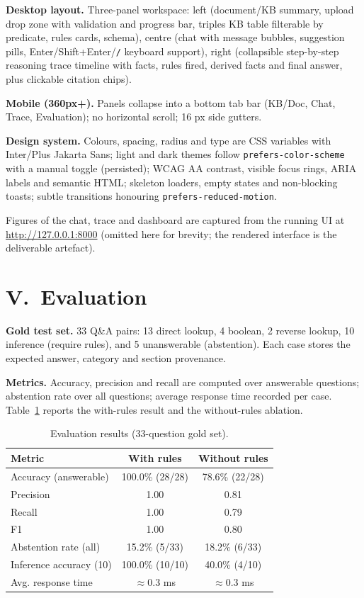 \documentclass[10pt,twocolumn]{article}
\begin{document}
\textbf{Desktop layout.} Three-panel workspace: left (document/KB summary,
upload drop zone with validation and progress bar, triples KB table filterable by
predicate, rules cards, schema), centre (chat with message bubbles, suggestion
pills, Enter/Shift+Enter/\texttt{/} keyboard support), right (collapsible
step-by-step reasoning trace timeline with facts, rules fired, derived facts and
final answer, plus clickable citation chips).

\textbf{Mobile (360px+).} Panels collapse into a bottom tab bar (KB/Doc, Chat,
Trace, Evaluation); no horizontal scroll; 16 px side gutters.

\textbf{Design system.} Colours, spacing, radius and type are CSS variables with
Inter/Plus Jakarta Sans; light and dark themes follow
\verb|prefers-color-scheme| with a manual toggle (persisted); WCAG AA contrast,
visible focus rings, ARIA labels and semantic HTML; skeleton loaders, empty
states and non-blocking toasts; subtle transitions honouring
\verb|prefers-reduced-motion|.

Figures of the chat, trace and dashboard are captured from the running UI at
\url{http://127.0.0.1:8000} (omitted here for brevity; the rendered interface is
the deliverable artefact).

\section*{V.~Evaluation}
\textbf{Gold test set.} 33 Q\&A pairs: 13 direct lookup, 4 boolean, 2 reverse
lookup, 10 inference (require rules), and 5 unanswerable (abstention). Each case
stores the expected answer, category and section provenance.

\textbf{Metrics.} Accuracy, precision and recall are computed over answerable
questions; abstention rate over all questions; average response time recorded per
case. Table~\ref{tab:metrics} reports the with-rules result and the
without-rules ablation.

\begin{table}[h]
\centering\small
\caption{Evaluation results (33-question gold set).}
\label{tab:metrics}
\begin{tabular}{lcc}
\toprule
\textbf{Metric} & \textbf{With rules} & \textbf{Without rules} \\
\midrule
Accuracy (answerable) & 100.0\% (28/28) & 78.6\% (22/28) \\
Precision & 1.00 & 0.81 \\
Recall & 1.00 & 0.79 \\
F1 & 1.00 & 0.80 \\
Abstention rate (all) & 15.2\% (5/33) & 18.2\% (6/33) \\
Inference accuracy (10) & 100.0\% (10/10) & 40.0\% (4/10) \\
Avg. response time & $\approx$0.3 ms & $\approx$0.3 ms \\
\bottomrule
\end{tabular}
\end{table}
\end{document}
